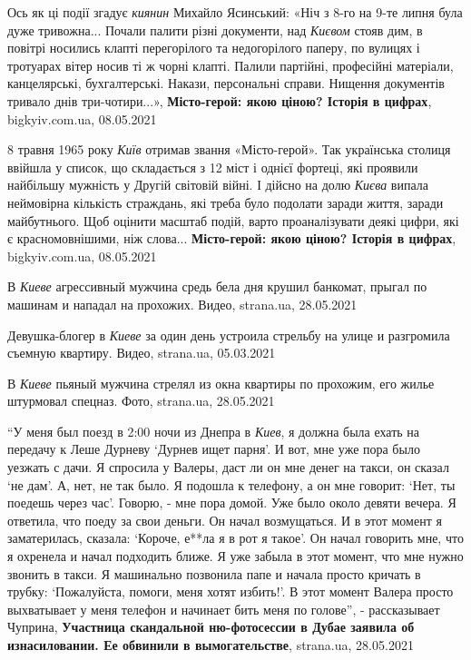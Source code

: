 Ось як ці події згадує \emph{киянин} Михайло Ясинський: «Ніч з 8-го на 9-те
липня була дуже тривожна... Почали палити різні документи, над \emph{Києвом}
стояв дим, в повітрі носились клапті перегорілого та недогорілого паперу, по
вулицях і тротуарах вітер носив ті ж чорні клапті. Палили партійні, професійні
матеріали, канцелярські, бухгалтерські. Накази, персональні справи.  Нищення
документів тривало днів три-чотири...», \textbf{Місто-герой: якою ціною? Історія
в цифрах}, bigkyiv.com.ua, 08.05.2021

8 травня 1965 року \emph{Київ} отримав звання «Місто-герой». Так українська
столиця ввійшла у список, що складається з 12 міст і однієї фортеці, які
проявили найбільшу мужність у Другій світовій війні. І дійсно на долю
\emph{Києва} випала неймовірна кількість страждань, які треба було подолати
заради життя, заради майбутнього. Щоб оцінити масштаб подій, варто
проаналізувати деякі цифри, які є красномовнішими, ніж слова...
\textbf{Місто-герой: якою ціною? Історія в цифрах}, bigkyiv.com.ua, 08.05.2021

В \emph{Киеве} агрессивный мужчина средь бела дня крушил банкомат, прыгал по
машинам и нападал на прохожих. Видео, strana.ua, 28.05.2021

Девушка-блогер в \emph{Киеве} за один день устроила стрельбу на улице и
разгромила съемную квартиру. Видео, strana.ua, 05.03.2021

В \emph{Киеве} пьяный мужчина стрелял из окна квартиры по прохожим, его жилье
штурмовал спецназ. Фото, strana.ua, 28.05.2021

\enquote{У меня был поезд в 2:00 ночи из Днепра в \emph{Киев}, я должна была ехать на передачу
к Леше Дурневу \enquote{Дурнев ищет парня}. И вот, мне уже пора было уезжать с дачи. Я
спросила у Валеры, даст ли он мне денег на такси, он сказал \enquote{не дам}. А, нет,
не так было. Я подошла к телефону, а он мне говорит: \enquote{Нет, ты поедешь через
час}. Говорю, - мне пора домой. Уже было около девяти вечера. Я ответила, что
поеду за свои деньги. Он начал возмущаться. И в этот момент я заматерилась,
сказала: \enquote{Короче, е**ла я в рот я такое}. Он начал говорить мне, что я
охренела и начал подходить ближе. Я уже забыла в этот момент, что мне нужно
звонить в такси. Я машинально позвонила папе и начала просто кричать в трубку:
\enquote{Пожалуйста, помоги, меня хотят избить!}. В этот момент Валера просто
выхватывает у меня телефон и начинает бить меня по голове}, - рассказывает
Чуприна, \textbf{Участница скандальной ню-фотосессии в Дубае заявила об
изнасиловании. Ее обвинили в вымогательстве}, strana.ua, 28.05.2021


